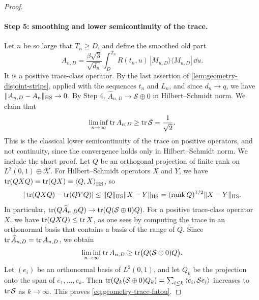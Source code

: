 \begin{proof}
\paragraph{Step 5: smoothing and lower semicontinuity of the trace.}
Let $n$ be so large that $T_n\ge D$, and define the smoothed old part
\[
 A_{n,D}=\frac{\beta\sqrt3}{\sqrt{d_n}}\int_D^{T_n}R(t_n,u)\,|M_{u,D}\rangle\langle M_{u,D}|\,\dd u .
\]
It is a positive trace-class operator. By the last assertion of \cref{lem:geometry-disjoint-strips}, applied with the sequences $t_n$ and $L_n$, and since $d_n\to q$, we have $\lVert A_{n,D}-A_n\rVert_{\mathrm{HS}}\to0$. By Step 4, $\widehat A_{n,D}\to\mathcal S\oplus0$ in Hilbert--Schmidt norm. We claim that
\begin{equation}
 \liminf_{n\to\infty}\operatorname{tr} A_{n,D}\ge\operatorname{tr}\mathcal S=\frac1{\sqrt2} .
 \label{eq:geometry-trace-fatou}
\end{equation}
This is the classical lower semicontinuity of the trace on positive operators, and not continuity, since the convergence holds only in Hilbert--Schmidt norm. We include the short proof. Let $Q$ be an orthogonal projection of finite rank on $L^2(0,1)\oplus\mathcal K$. For Hilbert--Schmidt operators $X$ and $Y$, we have $\operatorname{tr}(QXQ)=\operatorname{tr}(QX)=\left\langle Q,X\right\rangle_{\mathrm{HS}}$, so
\[
 |\operatorname{tr}(QXQ)-\operatorname{tr}(QYQ)|\le\lVert Q\rVert_{\mathrm{HS}}\lVert X-Y\rVert_{\mathrm{HS}}=(\operatorname{rank}Q)^{1/2}\lVert X-Y\rVert_{\mathrm{HS}} .
\]
In particular, $\operatorname{tr}(Q\widehat A_{n,D}Q)\to\operatorname{tr}(Q(\mathcal S\oplus0)Q)$. For a positive trace-class operator $X$, we have $\operatorname{tr}(QXQ)\le\operatorname{tr} X$, as one sees by computing the trace in an orthonormal basis that contains a basis of the range of $Q$. Since $\operatorname{tr}\widehat A_{n,D}=\operatorname{tr} A_{n,D}$, we obtain
\[
 \liminf_{n\to\infty}\operatorname{tr} A_{n,D}\ge\operatorname{tr}\bigl(Q(\mathcal S\oplus0)Q\bigr).
\]
Let $(e_i)$ be an orthonormal basis of $L^2(0,1)$, and let $Q_k$ be the projection onto the span of $e_1,\dots,e_k$. Then $\operatorname{tr}(Q_k(\mathcal S\oplus0)Q_k)=\sum_{i\le k}\left\langle e_i,\mathcal Se_i\right\rangle$ increases to $\operatorname{tr}\mathcal S$ as $k\to\infty$. This proves \eqref{eq:geometry-trace-fatou}.


\end{proof}
